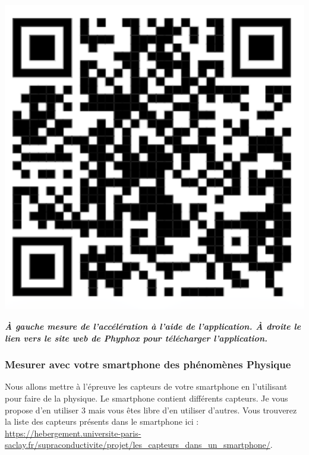 \documentclass[french, a4paper, 12pt]{article}
\begin{document}
{\begin{minipage}{.3\textwidth}
		\includegraphics[width=1\textwidth]{PhyphoxQRcode.png}
	\end{minipage}\smallskip

	\textbf{\textit{À gauche mesure de l'accélération à l'aide de l'application. À droite le lien vers le site web de Phyphox pour télécharger l'application.}}

}




\subsubsection{Mesurer avec votre smartphone des phénomènes Physique}

	Nous allons mettre à l'épreuve les capteurs de votre smartphone en l'utilisant pour faire de la physique. Le smartphone contient différents capteurs. Je vous propose d'en utiliser 3 mais vous êtes libre d'en utiliser d'autres. Vous trouverez la liste des capteurs présents dans le smartphone ici : \url{https://hebergement.universite-paris-saclay.fr/supraconductivite/projet/les_capteurs_dans_un_smartphone/}.\medskip
\end{document}
